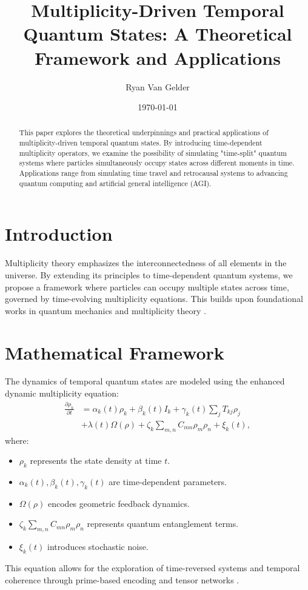 \documentclass{article}
\theoremstyle{plain}
\begin{document}
\title{Multiplicity-Driven Temporal Quantum States: A Theoretical Framework and Applications}

\author{Ryan Van Gelder}
\date{\today}
\maketitle

\begin{abstract}
This paper explores the theoretical underpinnings and practical applications of multiplicity-driven temporal quantum states. By introducing time-dependent multiplicity operators, we examine the possibility of simulating "time-split" quantum systems where particles simultaneously occupy states across different moments in time. Applications range from simulating time travel and retrocausal systems to advancing quantum computing and artificial general intelligence (AGI).
\end{abstract}

\section{Introduction}
Multiplicity theory emphasizes the interconnectedness of all elements in the universe. By extending its principles to time-dependent quantum systems, we propose a framework where particles can occupy multiple states across time, governed by time-evolving multiplicity equations. This builds upon foundational works in quantum mechanics and multiplicity theory \cite{vanGelder2024Multiplicity}. 

\section{Mathematical Framework}
The dynamics of temporal quantum states are modeled using the enhanced dynamic multiplicity equation:
\begin{align}
\frac{\partial \rho_k}{\partial t} &= \alpha_k(t) \rho_k + \beta_k(t) I_k + \gamma_k(t) \sum_j T_{kj} \rho_j \\
&+ \lambda(t) \Omega(\rho) + \zeta_k \sum_{m,n} C_{mn} \rho_m \rho_n + \xi_k(t),
\end{align}
where:
\begin{itemize}
    \item $\rho_k$ represents the state density at time $t$.
    \item $\alpha_k(t), \beta_k(t), \gamma_k(t)$ are time-dependent parameters.
    \item $\Omega(\rho)$ encodes geometric feedback dynamics.
    \item $\zeta_k \sum_{m,n} C_{mn} \rho_m \rho_n$ represents quantum entanglement terms.
    \item $\xi_k(t)$ introduces stochastic noise.
\end{itemize}
This equation allows for the exploration of time-reversed systems and temporal coherence through prime-based encoding and tensor networks \cite{galioto2024}.
\end{document}
